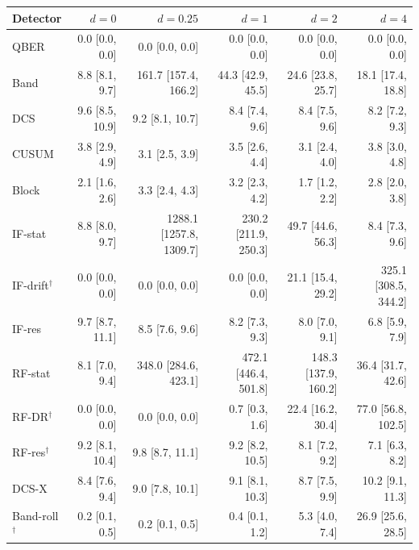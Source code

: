 \begin{tabular}{lrrrrr}
\hline
Detector & $d=0$ & $d=0.25$ & $d=1$ & $d=2$ & $d=4$\\
\hline
QBER & 0.0 [0.0, 0.0] & 0.0 [0.0, 0.0] & 0.0 [0.0, 0.0] & 0.0 [0.0, 0.0] & 0.0 [0.0, 0.0]\\
Band & 8.8 [8.1, 9.7] & 161.7 [157.4, 166.2] & 44.3 [42.9, 45.5] & 24.6 [23.8, 25.7] & 18.1 [17.4, 18.8]\\
DCS & 9.6 [8.5, 10.9] & 9.2 [8.1, 10.7] & 8.4 [7.4, 9.6] & 8.4 [7.5, 9.6] & 8.2 [7.2, 9.3]\\
CUSUM & 3.8 [2.9, 4.9] & 3.1 [2.5, 3.9] & 3.5 [2.6, 4.4] & 3.1 [2.4, 4.0] & 3.8 [3.0, 4.8]\\
Block & 2.1 [1.6, 2.6] & 3.3 [2.4, 4.3] & 3.2 [2.3, 4.2] & 1.7 [1.2, 2.2] & 2.8 [2.0, 3.8]\\
IF-stat & 8.8 [8.0, 9.7] & 1288.1 [1257.8, 1309.7] & 230.2 [211.9, 250.3] & 49.7 [44.6, 56.3] & 8.4 [7.3, 9.6]\\
IF-drift$^\dagger$ & 0.0 [0.0, 0.0] & 0.0 [0.0, 0.0] & 0.0 [0.0, 0.0] & 21.1 [15.4, 29.2] & 325.1 [308.5, 344.2]\\
IF-res & 9.7 [8.7, 11.1] & 8.5 [7.6, 9.6] & 8.2 [7.3, 9.3] & 8.0 [7.0, 9.1] & 6.8 [5.9, 7.9]\\
RF-stat & 8.1 [7.0, 9.4] & 348.0 [284.6, 423.1] & 472.1 [446.4, 501.8] & 148.3 [137.9, 160.2] & 36.4 [31.7, 42.6]\\
RF-DR$^\dagger$ & 0.0 [0.0, 0.0] & 0.0 [0.0, 0.0] & 0.7 [0.3, 1.6] & 22.4 [16.2, 30.4] & 77.0 [56.8, 102.5]\\
RF-res$^\dagger$ & 9.2 [8.1, 10.4] & 9.8 [8.7, 11.1] & 9.2 [8.2, 10.5] & 8.1 [7.2, 9.2] & 7.1 [6.3, 8.2]\\
DCS-X & 8.4 [7.6, 9.4] & 9.0 [7.8, 10.1] & 9.1 [8.1, 10.3] & 8.7 [7.5, 9.9] & 10.2 [9.1, 11.3]\\
Band-roll$^\dagger$ & 0.2 [0.1, 0.5] & 0.2 [0.1, 0.5] & 0.4 [0.1, 1.2] & 5.3 [4.0, 7.4] & 26.9 [25.6, 28.5]\\
\hline
\end{tabular}